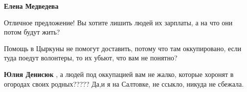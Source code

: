 \begin{itemize}
\begin{itemize}
\textbf{Елена Медведева} 

Отличное предложение! Вы хотите лишить людей их зарплаты, а на что они потом будут жить?

Помощь в Цыркуны не помогут доставить, потому что там оккупировано, если туда поедут волонтеры, то их убьют, что вам не понятно?

\textbf{Юлия Денисюк} , а людей под оккупацией вам не жалко, которые хоронят в огородах своих родных????? Да,и я на Салтовке, не ссыкло, никуда не сбежала.
\end{itemize} %

\end{itemize} %
